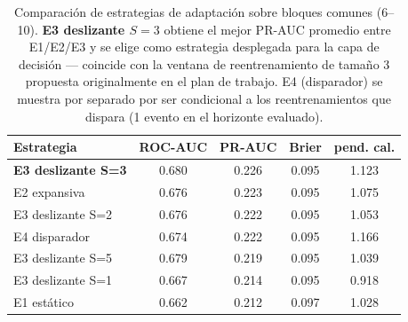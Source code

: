 \begin{table}[H]
\centering\small
\begin{tabular}{lcccc}
\toprule
Estrategia & ROC-AUC & PR-AUC & Brier & pend. cal. \\
\midrule
\textbf{E3 deslizante S=3} & 0.680 & 0.226 & 0.095 & 1.123 \\
E2 expansiva & 0.676 & 0.223 & 0.095 & 1.075 \\
E3 deslizante S=2 & 0.676 & 0.222 & 0.095 & 1.053 \\
E4 disparador & 0.674 & 0.222 & 0.095 & 1.166 \\
E3 deslizante S=5 & 0.679 & 0.219 & 0.095 & 1.039 \\
E3 deslizante S=1 & 0.667 & 0.214 & 0.095 & 0.918 \\
E1 estático & 0.662 & 0.212 & 0.097 & 1.028 \\
\bottomrule
\end{tabular}
\caption{Comparación de estrategias de adaptación sobre bloques comunes (6--10). \textbf{E3 deslizante $S=3$} obtiene el mejor PR-AUC promedio entre E1/E2/E3 y se elige como estrategia desplegada para la capa de decisión --- coincide con la ventana de reentrenamiento de tamaño 3 propuesta originalmente en el plan de trabajo. E4 (disparador) se muestra por separado por ser condicional a los reentrenamientos que dispara (1 evento en el horizonte evaluado).}
\label{tab:estrategias}
\end{table}
